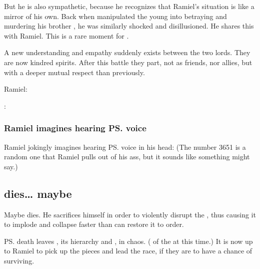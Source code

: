 But he is also sympathetic, because he recognizes that Ramiel's situation is like a mirror of his own. 
Back when \Daggerrain{} manipulated the young \Azraid{} into betraying and murdering his brother \Damiarch, he was similarly shocked and disillusioned. 
He shares this with Ramiel. 
This is a rare  moment for \Azraid. 

A new understanding and empathy suddenly exists between the two \resphan{} lords. 
They are now kindred spirits. 
After this battle they part, not as friends, nor allies, but with a deeper mutual respect than previously. 

\begin{prose}
  Ramiel: 

  \Azraid: 
\end{prose}






\subsubsection{Ramiel imagines hearing \ps{\Daggerrain}{} voice}
Ramiel jokingly imagines hearing \ps{\Daggerrain}{} voice in his head: 
(The number 3651 is a random one that Ramiel pulls out of his ass, but it sounds like something \Daggerrain{} might say.)








\subsection{\Azraid dies\ldots{} maybe}
Maybe \Azraid{} dies. 
He sacrifices himself in order to violently disrupt the \Erebean{} \matrix{}, thus causing it to implode and collapse faster than \Daggerrain{} can restore it to order. 

\ps{\Azraid} death leaves \CiriathSepher{}, its hierarchy and \matrix, in chaos. 
( of the  at this time.)
It is now up to Ramiel to pick up the pieces and lead the \resphan{} race, if they are to have a chance of surviving. 

